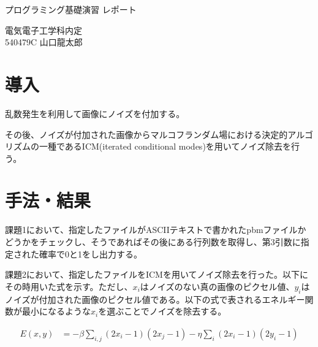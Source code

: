 \documentclass[11pt, oneside]{jsarticle}   	%
\begin{document}
\makeatletter
\begin{center}
    \Large プログラミング基礎演習 レポート
\end{center}
\begin{flushright}
    \normalsize 電気電子工学科内定 \\
    \large 540479C 山口龍太郎
\end{flushright}
\section*{導入}

    乱数発生を利用して画像にノイズを付加する。

    その後、ノイズが付加された画像からマルコフランダム場における決定的アルゴリズムの一種であるICM(iterated conditional modes)を用いてノイズ除去を行う。

\section*{手法・結果}
    課題1において、指定したファイルがASCIIテキストで書かれたpbmファイルかどうかをチェックし、そうであればその後にある行列数を取得し、第3引数に指定された確率で0と1をし出力する。

    課題2において、指定したファイルをICMを用いてノイズ除去を行った。以下にその時用いた式を示す。ただし、$x_i$はノイズのない真の画像のピクセル値、$y_i$はノイズが付加された画像のピクセル値である。以下の式で表されるエネルギー関数が最小になるような$x_i$を選ぶことでノイズを除去する。

    \begin{align*}
    E(x, y) &= -\beta\sum_{i, j}(2x_i - 1)(2x_j - 1) - \eta\sum_i(2x_i - 1)(2y_i - 1)
    \end{align*}
\end{document}
